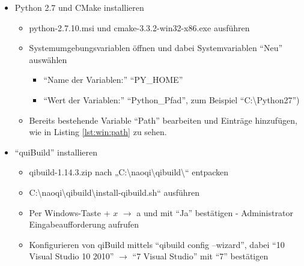             \begin{itemize}
                \item Python 2.7 und CMake installieren
                \begin{itemize}
                    \item python-2.7.10.msi und cmake-3.3.2-win32-x86.exe
                        ausführen

                    \item Systemumgebungsvariablen öffnen und dabei
                        Systemvariablen ``Neu''  auswählen

                    \begin{itemize}
                        \item ``Name der Variablen:'' ``PY\_HOME''
                        \item ``Wert der Variablen:'' ``Python\_Pfad'',
                            zum Beispiel ``C:\textbackslash{}Python27'')
                    \end{itemize}

                    \item Bereits bestehende Variable ``Path'' bearbeiten und
                        Einträge hinzufügen, wie in Listing \ref{lst:win:path}
                        zu sehen.
                \end{itemize}

                \item ``quiBuild'' installieren
                \begin{itemize}
                    \item qibuild-1.14.3.zip nach „C:\textbackslash{}naoqi\textbackslash{}qibuild\textbackslash{}“ entpacken

                    \item C:\textbackslash{}naoqi\textbackslash{}qibuild\textbackslash{}install-qibuild.sh“ ausführen

                    \item Per Windows-Taste + $x$ $\rightarrow$ a und mit
                        ``Ja'' bestätigen - Administrator Eingabeaufforderung
                        aufrufen

                    \item Konfigurieren von qiBuild mittels
                        ``qibuild config --wizard'', dabei
                        ``10 Visual Studio 10 2010'' $\rightarrow$ ``7 Visual
                        Studio'' mit ``7'' bestätigen
                \end{itemize}


\end{itemize}
